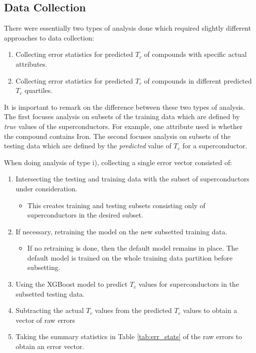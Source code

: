 \documentclass[oneside,12pt]{amsart}
\begin{document}
 \subsection{Data Collection}
 
 There were essentially two types of analysis done which required slightly different approaches to data collection:
 \begin{enumerate}[label=\roman*)]
     \item Collecting error statistics for predicted $T_c$ of compounds with specific actual attributes.
     \item Collecting error statistics for predicted $T_c$ of compounds in different predicted $T_c$ quartiles.
 \end{enumerate}
 It is important to remark on the difference between these two types of analysis. The first focuses analysis on subsets of the training data which are defined by \textit{true} values of the superconductors. For example, one attribute used is whether the compound contains Iron. The second focuses analysis on subsets of the testing data which are defined by the \textit{predicted} value of $T_c$ for a superconductor. 
 
 When doing analysis of type i), collecting a single error vector consisted of:
 \begin{enumerate}
     \item Intersecting the testing and training data with the subset of superconductors under consideration.
     \begin{itemize}
         \item This creates training and testing subsets consisting only of superconductors in the desired subset.
     \end{itemize}
     \item If necessary, retraining the model on the new subsetted training data.
     \begin{itemize}
         \item If no retraining is done, then the default model remains in place. The default model is trained on the whole training data partition before subsetting.
     \end{itemize}
     \item Using the XGBoost model to predict $T_c$ values for superconductors in the subsetted testing data.
     \item Subtracting the actual $T_c$ values from the predicted $T_c$ values to obtain a vector of raw errors
     \item Taking the summary statistics in Table \ref{tab:err_stats} of the raw errors to obtain an error vector.
 \end{enumerate}
 
\end{document}
